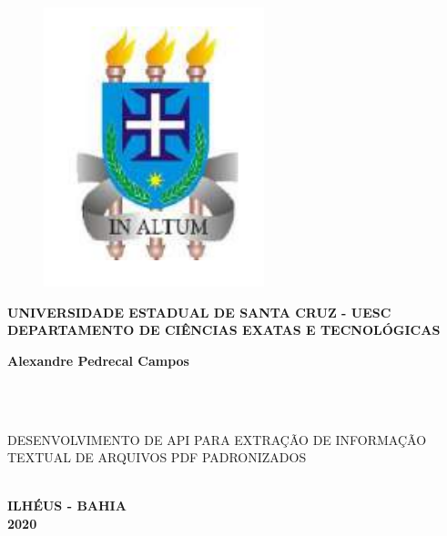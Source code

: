 \thispagestyle{empty}

\vfill
 \begin{center}

    \begin{figure}
	   \centering
	   		\includegraphics[scale=0.35]{figs/brasao_uesc.png}
    \end{figure}

    {\large\bfseries UNIVERSIDADE ESTADUAL DE SANTA CRUZ - UESC} \\


    {\large\bfseries DEPARTAMENTO DE CIÊNCIAS EXATAS E TECNOLÓGICAS}  \\

    \vspace*{1in}
    \begin{large} \bfseries Alexandre Pedrecal Campos \end{large}\\[0.4in]

    \vspace*{4cm}
    \noindent \\

    \large\bfseries{\begin{large}DESENVOLVIMENTO DE API PARA EXTRAÇÃO DE INFORMAÇÃO TEXTUAL DE ARQUIVOS PDF PADRONIZADOS\end{large}} \\
    \vfill
    \large\bfseries{ ILHÉUS - BAHIA \\ 2020}
\end{center}

\normalsize


